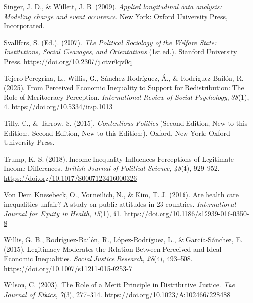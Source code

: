 \documentclass[
  12pt,
]{article}
\newlength{\cslhangindent}
\newlength{\cslentryspacingunit} %
\newenvironment{CSLReferences}[2] %
 {%
  \setlength{\parindent}{0pt}
  \ifodd #1
  \let\oldpar\par
  \def\par{\hangindent=\cslhangindent\oldpar}
  \fi
  \setlength{\parskip}{#2\cslentryspacingunit}
 }%
 {}
\begin{document}
\begin{CSLReferences}{1}{0}
\leavevmode{}%
Singer, J. D., \& Willett, J. B. (2009). \emph{Applied longitudinal data
analysis: Modeling change and event occurence}. New York: Oxford
University Press, Incorporated.

\leavevmode{}%
Svallfors, S. (Ed.). (2007). \emph{The {Political Sociology} of the
{Welfare State}: {Institutions}, {Social Cleavages}, and {Orientations}}
(1st ed.). Stanford University Press.
\url{https://doi.org/10.2307/j.ctvr0qv0q}

\leavevmode{}%
Tejero-Peregrina, L., Willis, G., Sánchez-Rodríguez, Á., \&
Rodríguez-Bailón, R. (2025). From {Perceived Economic Inequality} to
{Support} for {Redistribution}: {The Role} of {Meritocracy Perception}.
\emph{International Review of Social Psychology}, \emph{38}(1), 4.
\url{https://doi.org/10.5334/irsp.1013}

\leavevmode{}%
Tilly, C., \& Tarrow, S. (2015). \emph{Contentious {Politics}} (Second
Edition, New to this Edition:, Second Edition, New to this Edition:).
Oxford, New York: Oxford University Press.

\leavevmode{}%
Trump, K.-S. (2018). Income {Inequality Influences Perceptions} of
{Legitimate Income Differences}. \emph{British Journal of Political
Science}, \emph{48}(4), 929--952.
\url{https://doi.org/10.1017/S0007123416000326}

\leavevmode{}%
Von Dem Knesebeck, O., Vonneilich, N., \& Kim, T. J. (2016). Are health
care inequalities unfair? {A} study on public attitudes in 23 countries.
\emph{International Journal for Equity in Health}, \emph{15}(1), 61.
\url{https://doi.org/10.1186/s12939-016-0350-8}

\leavevmode{}%
Willis, G. B., Rodríguez-Bailón, R., López-Rodríguez, L., \&
García-Sánchez, E. (2015). Legitimacy {Moderates} the {Relation Between
Perceived} and {Ideal Economic Inequalities}. \emph{Social Justice
Research}, \emph{28}(4), 493--508.
\url{https://doi.org/10.1007/s11211-015-0253-7}

\leavevmode{}%
Wilson, C. (2003). The {Role} of a {Merit Principle} in {Distributive
Justice}. \emph{The Journal of Ethics}, \emph{7}(3), 277--314.
\url{https://doi.org/10.1023/A:1024667228488}


\end{CSLReferences}
\end{document}
